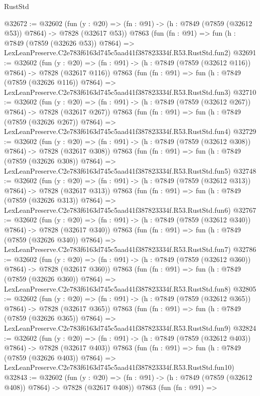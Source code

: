 \begin{lexlean}{RustStd}
\begin{coremodule}
@32672 := @32602
    (fun (y : @20) => (fn : @91) -> (h : @7849 (@7859 (@32612 @53)) @7864) -> @7828 (@32617 @53))
    @7863
    (fun (fn : @91) =>
    fun (h : @7849 (@7859 (@32626 @53)) @7864) =>
    LexLeanPreserve.C2e783f6163d745c5aad41f387823334f.R53.RustStd.fun2)
@32691 := @32602
    (fun (y : @20) => (fn : @91) -> (h : @7849 (@7859 (@32612 @116)) @7864) -> @7828 (@32617 @116))
    @7863
    (fun (fn : @91) =>
    fun (h : @7849 (@7859 (@32626 @116)) @7864) =>
    LexLeanPreserve.C2e783f6163d745c5aad41f387823334f.R53.RustStd.fun3)
@32710 := @32602
    (fun (y : @20) => (fn : @91) -> (h : @7849 (@7859 (@32612 @267)) @7864) -> @7828 (@32617 @267))
    @7863
    (fun (fn : @91) =>
    fun (h : @7849 (@7859 (@32626 @267)) @7864) =>
    LexLeanPreserve.C2e783f6163d745c5aad41f387823334f.R53.RustStd.fun4)
@32729 := @32602
    (fun (y : @20) => (fn : @91) -> (h : @7849 (@7859 (@32612 @308)) @7864) -> @7828 (@32617 @308))
    @7863
    (fun (fn : @91) =>
    fun (h : @7849 (@7859 (@32626 @308)) @7864) =>
    LexLeanPreserve.C2e783f6163d745c5aad41f387823334f.R53.RustStd.fun5)
@32748 := @32602
    (fun (y : @20) => (fn : @91) -> (h : @7849 (@7859 (@32612 @313)) @7864) -> @7828 (@32617 @313))
    @7863
    (fun (fn : @91) =>
    fun (h : @7849 (@7859 (@32626 @313)) @7864) =>
    LexLeanPreserve.C2e783f6163d745c5aad41f387823334f.R53.RustStd.fun6)
@32767 := @32602
    (fun (y : @20) => (fn : @91) -> (h : @7849 (@7859 (@32612 @340)) @7864) -> @7828 (@32617 @340))
    @7863
    (fun (fn : @91) =>
    fun (h : @7849 (@7859 (@32626 @340)) @7864) =>
    LexLeanPreserve.C2e783f6163d745c5aad41f387823334f.R53.RustStd.fun7)
@32786 := @32602
    (fun (y : @20) => (fn : @91) -> (h : @7849 (@7859 (@32612 @360)) @7864) -> @7828 (@32617 @360))
    @7863
    (fun (fn : @91) =>
    fun (h : @7849 (@7859 (@32626 @360)) @7864) =>
    LexLeanPreserve.C2e783f6163d745c5aad41f387823334f.R53.RustStd.fun8)
@32805 := @32602
    (fun (y : @20) => (fn : @91) -> (h : @7849 (@7859 (@32612 @365)) @7864) -> @7828 (@32617 @365))
    @7863
    (fun (fn : @91) =>
    fun (h : @7849 (@7859 (@32626 @365)) @7864) =>
    LexLeanPreserve.C2e783f6163d745c5aad41f387823334f.R53.RustStd.fun9)
@32824 := @32602
    (fun (y : @20) => (fn : @91) -> (h : @7849 (@7859 (@32612 @403)) @7864) -> @7828 (@32617 @403))
    @7863
    (fun (fn : @91) =>
    fun (h : @7849 (@7859 (@32626 @403)) @7864) =>
    LexLeanPreserve.C2e783f6163d745c5aad41f387823334f.R53.RustStd.fun10)
@32843 := @32602
    (fun (y : @20) => (fn : @91) -> (h : @7849 (@7859 (@32612 @408)) @7864) -> @7828 (@32617 @408))
    @7863
    (fun (fn : @91) =>

\end{coremodule}
\end{lexlean}
